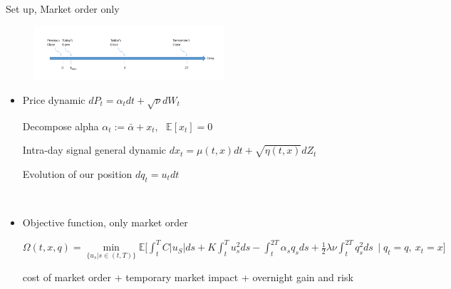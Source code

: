 \begin{frame}{Set up, Market order only}

\begin{figure}
    \centering
    \includegraphics[width=.7\textwidth,height=2cm]{img/timeline.png}
\end{figure}

\begin{itemize}

\item Price dynamic   $dP_t=\alpha_t dt+\sqrt\nu dW_t$

Decompose alpha   $\alpha_t:=\bar \alpha+x_t,\,\,\,\,  \mathbb E[x_t]=0$

Intra-day signal general dynamic   $dx_t=\mu(t,x)dt+\sqrt {\eta(t,x)}dZ_t$


Evolution of our position   $dq_t=u_tdt$

\\[1.2pt]

\item Objective function, only market order

$
      {\scriptstyle  \Omega(t,x,q)=  \min\limits_{\{u_s|s\in(t,T)  \}}  \mathbb E \big[\int_t^TC|u_S|ds +K\int_t^Tu_s^2ds
      -\int_t^{2T}\alpha_sq_sds +\frac12\lambda\nu\int_t^{2T}q_s^2ds \, \mid q_t=q ,\ x_t=x \big]  }
$

cost of market order + temporary market impact + overnight gain and risk


\end{itemize}
\end{frame}

